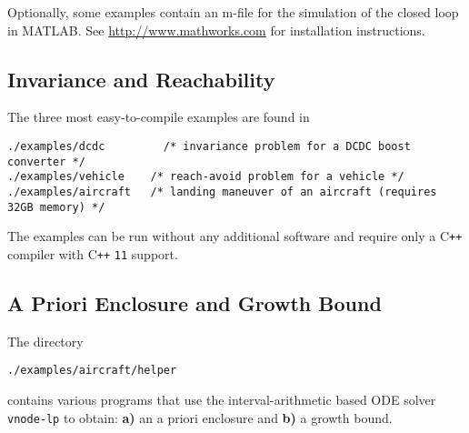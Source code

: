 \documentclass[a4paper]{amsart}
\newcommand\Cpp{C\texttt{++} }
\begin{document}
Optionally, some examples contain an m-file for the simulation of the
closed loop in MATLAB. See \url{http://www.mathworks.com} for installation
instructions.


\subsection{Invariance and Reachability}

The three most easy-to-compile examples are found in
\begin{lstlisting}[basicstyle=\small\ttfamily]
./examples/dcdc      	/* invariance problem for a DCDC boost converter */ 
./examples/vehicle    /* reach-avoid problem for a vehicle */ 
./examples/aircraft   /* landing maneuver of an aircraft (requires 32GB memory) */ 
\end{lstlisting}
The examples can be run without any additional software and require only a
\Cpp compiler with \Cpp{\tt11} support. 

%

\subsection{A Priori Enclosure and Growth Bound}
The directory 
\begin{lstlisting}[basicstyle=\small\ttfamily]
./examples/aircraft/helper        	
\end{lstlisting}
contains various programs that 
use the interval-arithmetic based ODE solver {\tt vnode-lp} to obtain:
{\bf a)} an a priori enclosure and {\bf b)} a growth
bound.
\end{document}
